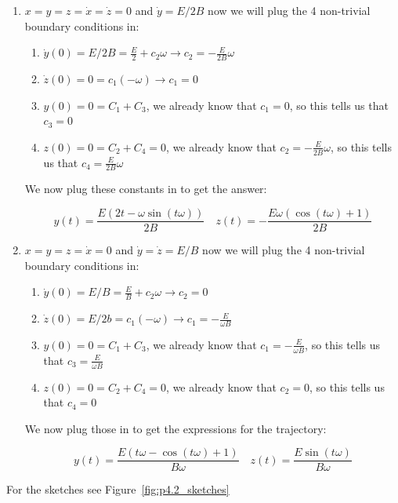 \documentclass{homework}
\begin{document}
\begin{homeworkProblem}[Problem 5.2]
{\begin{enumerate}
      We just learned that all constants are zero, so there is no net force and the particle continues with its velocity. In other words $y(t) = v_{y, 0} t = \frac{E}{B} t$
      \item $x=y=z=\dot{x}=\dot{z} = 0$ and $\dot{y} = E/2B$ now we will plug the 4 non-trivial boundary conditions in:
        \begin{enumerate}
          \item $\dot{y}(0) = E/2B = \frac{E}{2}+c_2 \omega \rightarrow c_2 = -\frac{E}{2B} \omega$
          \item $\dot{z}(0) = 0 = c_1 (-\omega ) \rightarrow c_1=0 $
          \item $y(0) = 0 = C_1 + C_3 $, we already know that $c_1 = 0$, so this tells us that $c_3 = 0$
          \item $z(0) = 0 = C_2 + C_4 = 0$, we already know that $c_2 = -\frac{E}{2B} \omega$, so this tells us that $c_4 = \frac{E}{2B} \omega$
        \end{enumerate}

        We now plug these constants in to get the answer:

        $$y(t) = \frac{E (2 t-\omega  \sin (t \omega ))}{2 B} \quad z(t) = -\frac{E \omega  (\cos (t \omega )+1)}{2 B}$$
      \item $x=y=z=\dot{x} = 0$ and $\dot{y}= \dot{z}= E/B$ now we will plug the 4 non-trivial boundary conditions in:
        \begin{enumerate}
          \item $\dot{y}(0) = E/B = \frac{E}{B}+c_2 \omega \rightarrow c_2 = 0$
          \item $\dot{z}(0) = E/2b = c_1 (-\omega ) \rightarrow c_1= - \frac{E}{\omega B} $
          \item $y(0) = 0 = C_1 + C_3 $, we already know that $c_1 = - \frac{E}{\omega B}$, so this tells us that $c_3 =  \frac{E}{\omega B}$
          \item $z(0) = 0 = C_2 + C_4 = 0$, we already know that $c_2 = 0$, so this tells us that $c_4 = 0$
        \end{enumerate}

        We now plug those in to get the expressions for the trajectory:

        $$ y(t) = \frac{E (t \omega -\cos (t \omega )+1)}{B \omega } \quad z(t)= \frac{E \sin (t \omega )}{B \omega }$$
    \end{enumerate}

    For the sketches see Figure~\ref{fig:p4.2_sketches}

}
\end{homeworkProblem}
\end{document}
